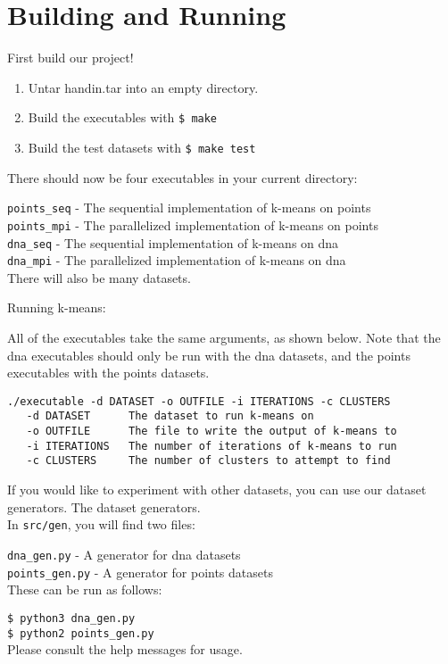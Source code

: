 \documentclass[12pt]{article}
\begin{document}
\section{Building and Running}
 
First build our project!

\begin{enumerate}
\item Untar handin.tar into an empty directory.
\item Build the executables with \texttt{\$ make}
\item Build the test datasets with \texttt{\$ make test}
\end{enumerate}

There should now be four executables in your current directory: 


\texttt{points\_seq} - The sequential implementation of k-means on points \\
\texttt{points\_mpi} - The parallelized implementation of k-means on points \\
\texttt{dna\_seq} - The sequential implementation of k-means on dna \\
\texttt{dna\_mpi} - The parallelized implementation of k-means on dna \\

There will also be many datasets.

Running k-means:

All of the executables take the same arguments, as shown below. Note that the dna executables should only be run with the dna datasets, and the points executables with the points datasets.

\begin{verbatim}
./executable -d DATASET -o OUTFILE -i ITERATIONS -c CLUSTERS
   -d DATASET      The dataset to run k-means on
   -o OUTFILE      The file to write the output of k-means to
   -i ITERATIONS   The number of iterations of k-means to run
   -c CLUSTERS     The number of clusters to attempt to find
 \end{verbatim}

 If you would like to experiment with other datasets, you can use our dataset generators. The dataset generators.\\


 In \texttt{src/gen}, you will find two files: 


 \texttt{dna\_gen.py} - A generator for dna datasets \\
 \texttt{points\_gen.py} - A generator for points datasets \\


 These can be run as follows:


 \texttt{\$ python3 dna\_gen.py} \\
 \texttt{\$ python2 points\_gen.py} \\

 Please consult the help messages for usage.
\end{document}

